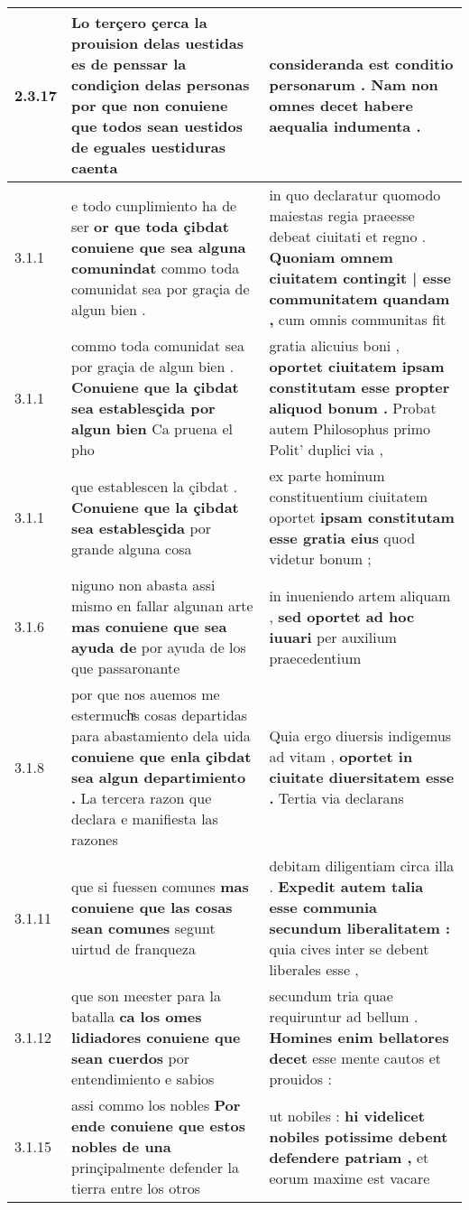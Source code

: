 \begin{tabular}{|p{1cm}|p{6.5cm}|p{6.5cm}|}
2.3.17 & Lo terçero çerca la prouision delas uestidas es de penssar la condiçion delas personas \textbf{ por que non conuiene que todos sean uestidos } de eguales uestiduras caenta & consideranda est conditio personarum . \textbf{ Nam non omnes decet } habere aequalia indumenta . \\\hline
3.1.1 & e todo cunplimiento ha de ser \textbf{ or que toda çibdat conuiene que sea alguna comunindat } commo toda comunidat sea por graçia de algun bien . & in quo declaratur quomodo maiestas regia praeesse debeat ciuitati et regno . \textbf{ Quoniam omnem ciuitatem contingit | esse communitatem quandam , } cum omnis communitas fit \\\hline
3.1.1 & commo toda comunidat sea por graçia de algun bien . \textbf{ Conuiene que la çibdat sea establesçida por algun bien } Ca pruena el pho & gratia alicuius boni , \textbf{ oportet ciuitatem ipsam constitutam esse propter aliquod bonum . } Probat autem Philosophus primo Polit’ duplici via , \\\hline
3.1.1 & que establescen la çibdat . \textbf{ Conuiene que la çibdat sea establesçida } por grande alguna cosa & ex parte hominum constituentium ciuitatem oportet \textbf{ ipsam constitutam esse gratia eius } quod videtur bonum ; \\\hline
3.1.6 & niguno non abasta assi mismo en fallar algunan arte \textbf{ mas conuiene que sea ayuda de } por ayuda de los que passaronante & in inueniendo artem aliquam , \textbf{ sed oportet ad hoc iuuari } per auxilium praecedentium \\\hline
3.1.8 & por que nos auemos me estermuchͣs cosas departidas para abastamiento dela uida \textbf{ conuiene que enla çibdat sea algun departimiento . } La tercera razon que declara e manifiesta las razones & Quia ergo diuersis indigemus ad vitam , \textbf{ oportet in ciuitate diuersitatem esse . } Tertia via declarans \\\hline
3.1.11 & que si fuessen comunes \textbf{ mas conuiene que las cosas sean comunes } segunt uirtud de franqueza & debitam diligentiam circa illa . \textbf{ Expedit autem talia esse communia secundum liberalitatem : } quia cives inter se debent liberales esse , \\\hline
3.1.12 & que son meester para la batalla \textbf{ ca los omes lidiadores conuiene que sean cuerdos } por entendimiento e sabios & secundum tria quae requiruntur ad bellum . \textbf{ Homines enim bellatores decet } esse mente cautos et prouidos : \\\hline
3.1.15 & assi commo los nobles \textbf{ Por ende conuiene que estos nobles de una } prinçipalmente defender la tierra entre los otros & ut nobiles : \textbf{ hi videlicet nobiles potissime debent defendere patriam , } et eorum maxime est vacare \\\hline

\end{tabular}
